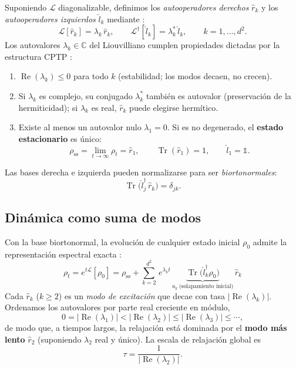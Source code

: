 \documentclass[11pt,a4paper]{article}
\theoremstyle{definition}
\theoremstyle{plain}
\newcommand{\Lop}{\mathcal{L}}
\newcommand{\Ldual}{\mathcal{L}^{\dagger}}
\newcommand{\rss}{\rho_{\mathrm{ss}}}
\renewcommand{\Tr}{\operatorname{Tr}}
\begin{document}
Suponiendo $\Lop$ diagonalizable, definimos los \emph{autooperadores derechos} $\hat r_k$ y los
\emph{autooperadores izquierdos} $\hat l_k$ mediante \cite{Carollo2021,LiYang2026}:
\begin{equation}
\Lop[\hat r_k]=\lambda_k\,\hat r_k,
\qquad
\Ldual[\hat l_k]=\lambda_k^{*}\,\hat l_k,
\qquad k=1,\dots,d^2 .
\label{eq:eig}
\end{equation}
Los autovalores $\lambda_k\in\mathbb{C}$ del Liouvilliano cumplen propiedades dictadas por la estructura
CPTP \cite{Carollo2021,Minganti2018}:
\begin{enumerate}[leftmargin=1.6em,itemsep=2pt]
\item $\operatorname{Re}(\lambda_k)\le 0$ para todo $k$ (estabilidad; los modos decaen, no crecen).
\item Si $\lambda_k$ es complejo, su conjugado $\lambda_k^{*}$ también es autovalor (preservación de la
hermiticidad); si $\lambda_k$ es real, $\hat r_k$ puede elegirse hermítico.
\item Existe al menos un autovalor nulo $\lambda_1=0$. Si es no degenerado, el \textbf{estado
estacionario} es único:
\begin{equation}
\rss=\lim_{t\to\infty}\rho_t=\hat r_1,\qquad \Tr(\hat r_1)=1,\qquad \hat l_1=\mathbb{1}.
\end{equation}
\end{enumerate}
Las bases derecha e izquierda pueden normalizarse para ser \emph{biortonormales}:
\begin{equation}
\Tr\!\big(\hat l_j^{\dagger}\,\hat r_k\big)=\delta_{jk}.
\label{eq:biorth}
\end{equation}

\subsection{Dinámica como suma de modos}

Con la base biortonormal, la evolución de cualquier estado inicial $\rho_0$ admite la representación
espectral exacta \cite{Carollo2021,LiYang2026,Chattopadhyay2026}:
\begin{equation}
\boxed{\;
\rho_t=e^{t\Lop}[\rho_0]
=\rss+\sum_{k=2}^{d^2}\, e^{\lambda_k t}\,
\underbrace{\Tr\!\big(\hat l_k^{\dagger}\rho_0\big)}_{\displaystyle a_k\ \text{(solapamiento inicial)}}\,
\hat r_k \;}
\label{eq:spectral}
\end{equation}
Cada $\hat r_k$ ($k\ge2$) es un \emph{modo de excitación} que decae con tasa $|\!\operatorname{Re}(\lambda_k)|$.
Ordenamos los autovalores por parte real creciente en módulo,
\begin{equation}
0=|\operatorname{Re}(\lambda_1)| < |\operatorname{Re}(\lambda_2)| \le |\operatorname{Re}(\lambda_3)| \le\cdots,
\end{equation}
de modo que, a tiempos largos, la relajación está dominada por el \textbf{modo más lento} $\hat r_2$
(suponiendo $\lambda_2$ real y único). La escala de relajación global es
\begin{equation}
\tau=\frac{1}{|\operatorname{Re}(\lambda_2)|}.
\label{eq:tau}
\end{equation}
\end{document}
